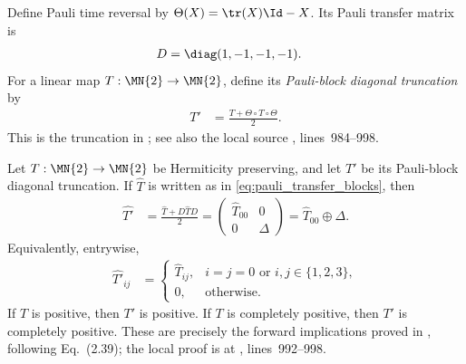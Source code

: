 \begin{definition}
    \label{def:pauli_block_diagonal_truncation}
    \leanok
    Define Pauli time reversal by
    $\Theta(X)=\tr(X)\Id-X$.  Its Pauli transfer matrix is
    \begin{align}
        D&=\diag(1,-1,-1,-1).
        \label{eq:pauli_time_reversal_diagonal}
    \end{align}
    For a linear map $T:\MN{2}\to\MN{2}$, define its
    \emph{Pauli-block diagonal truncation} by
    \begin{align}
        T'&=\frac{T+\Theta\circ T\circ\Theta}{2}.
        \label{eq:pauli_block_truncation}
    \end{align}
    This is the truncation in
    \cite[Proposition~2.10, Section~2.4]{Wolf2012Quantum}; see also the local
    source ,
    lines~984--998.
\end{definition}

\begin{theorem}
    \label{thm:pauli_block_truncation_forward}
    \leanok
    Let $T:\MN{2}\to\MN{2}$ be Hermiticity preserving, and let $T'$ be its
    Pauli-block diagonal truncation.  If $\widehat T$ is written as in
    \eqref{eq:pauli_transfer_blocks}, then
    \begin{align}
        \widehat{T'}
        &=\frac{\widehat T+D\widehat T D}{2}
          =\begin{pmatrix}
              \widehat T_{00}&0\\
              0&\Delta
            \end{pmatrix}
          =\widehat T_{00}\oplus\Delta.
        \label{eq:pauli_block_truncation_matrix}
    \end{align}
    Equivalently, entrywise,
    \begin{align}
        \widehat{T'}_{ij}
        &=\begin{cases}
            \widehat T_{ij},& i=j=0\text{ or }i,j\in\{1,2,3\},\\
            0,&\text{otherwise}.
          \end{cases}
        \label{eq:pauli_block_truncation_entrywise}
    \end{align}
    If $T$ is positive, then $T'$ is positive.  If $T$ is completely
    positive, then $T'$ is completely positive.  These are precisely the
    forward implications proved in
    \cite[Proposition~2.10, Section~2.4]{Wolf2012Quantum}, following
    Eq.~(2.39); the local proof is at
    , lines~992--998.
\end{theorem}

